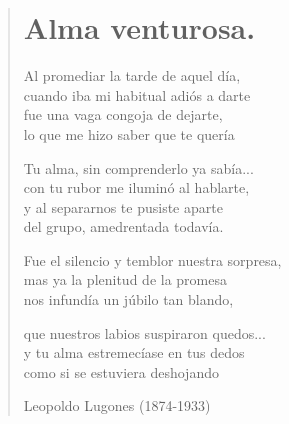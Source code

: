 \documentclass[12pt, twoside]{book}
\begin{document}
\begin{verse}
\begin{center}
\section{Alma venturosa.}
\end{center}

Al promediar la tarde de aquel día,\\
cuando iba mi habitual adiós a darte\\
fue una vaga congoja de dejarte,\\
lo que me hizo saber que te quería\newline

Tu alma, sin comprenderlo ya sabía...\\
con tu rubor me iluminó al hablarte,\\
y al separarnos te pusiste aparte\\
del grupo, amedrentada todavía.\newline

Fue el silencio y temblor nuestra sorpresa,\\
mas ya la plenitud de la promesa\\
nos infundía un júbilo tan blando,\newline

que nuestros labios suspiraron quedos...\\
y tu alma estremecíase en tus dedos\\
como si se estuviera deshojando\newline

Leopoldo Lugones (1874-1933)
\end{verse}
\newpage
\end{document}
